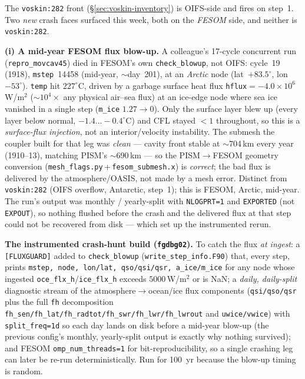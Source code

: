 \documentclass[11pt,a4paper]{article}
\newcommand{\code}[1]{\texttt{\small #1}}
\begin{document}
The \code{voskin:282} front (\S\ref{sec:voskin-inventory}) is OIFS-side and fires on step~1. Two
\emph{new} crash faces surfaced this week, both on the \emph{FESOM} side, and neither is
\code{voskin:282}.

\textbf{(i) A mid-year FESOM flux blow-up.} A colleague's 17-cycle concurrent run
(\code{repro\_movcav45}) died in FESOM's own \code{check\_blowup}, not OIFS: cycle~19 (1918),
\code{mstep}~14458 (mid-year, $\sim$day~201), at an \emph{Arctic} node (lat~$+83.5^\circ$,
lon~$-53^\circ$). \code{temp} hit $227^\circ$C, driven by a garbage surface heat flux
\code{hflux}$=-4.0\times10^{6}$\,W/m$^2$ ($\sim$$10^4\times$ any physical air--sea flux) at an
ice-edge node where sea ice vanished in a single step (\code{m\_ice} $1.27\to0$). Only the surface
layer blew up (every layer below normal, $-1.4\ldots-0.4^\circ$C) and CFL stayed $<1$ throughout, so
this is a \emph{surface-flux injection}, not an interior/velocity instability. The submesh the coupler
built for that leg was \emph{clean} --- cavity front stable at $\sim$704\,km every year (1910--13),
matching PISM's $\sim$690\,km --- so the PISM$\to$FESOM geometry conversion
(\code{mesh\_flags.py}\,+\,\code{fesom\_submesh.x}) is \emph{correct}; the bad flux is delivered by the
atmosphere/OASIS, not made by a mesh error. Distinct from \code{voskin:282} (OIFS overflow, Antarctic,
step~1); this is FESOM, Arctic, mid-year. The run's output was monthly / yearly-split with
\code{NLOGPRT=1} and \code{EXPORTED} (not \code{EXPOUT}), so nothing flushed before the crash and the
delivered flux at that step could not be recovered from disk --- which set up the instrumented rerun.

\textbf{The instrumented crash-hunt build (\code{fgdbg02}).} To catch the flux \emph{at ingest}: a
\code{[FLUXGUARD]} added to \code{check\_blowup} (\code{write\_step\_info.F90}) that, every step, prints
\code{mstep, node, lon/lat, qso/qsi/qsr, a\_ice/m\_ice} for any node whose ingested
\code{oce\_flx\_h}/\code{ice\_flx\_h} exceeds $5000$\,W/m$^2$ or is NaN; a \emph{daily, daily-split}
diagnostic stream of the atmosphere$\to$ocean/ice flux components (\code{qsi/qso/qsr} plus the full
\code{fh} decomposition \code{fh\_sen/fh\_lat/fh\_radtot/fh\_swr/fh\_lwr/fh\_lwrout} and \code{uwice/vwice})
with \code{split\_freq=1d} so each day lands on disk before a mid-year blow-up (the previous config's
monthly, yearly-split output is exactly why nothing survived); and FESOM \code{omp\_num\_threads=1} for
bit-reproducibility, so a single crashing leg can later be re-run deterministically. Run for 100~yr
because the blow-up timing is random.
\end{document}
